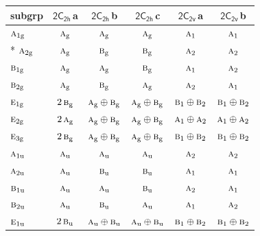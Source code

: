 \documentclass[10pt,a4paper]{article}
\numberwithin{equation}{section}
\newcommand{\grp}[1]{\mathsf{#1}}
\newcommand{\irr}[1]{\text{\normalfont\scshape #1}}
\newcommand{\ptag}[1]{\mathrm{#1}}
\newcommand{\clsletter}[1]{\,{\scriptsize\color{black!55}#1}}
\begin{document}
{\small\begin{longtable}{@{}lccccc@{}}\toprule
subgrp & \href{2C2h.pdf}{$\grp{2C_{2h}}$}\clsletter{a} & \href{2C2h.pdf}{$\grp{2C_{2h}}$}\clsletter{b} & \href{2C2h.pdf}{$\grp{2C_{2h}}$}\clsletter{c} & \href{2C2v.pdf}{$\grp{2C_{2v}}$}\clsletter{a} & \href{2C2v.pdf}{$\grp{2C_{2v}}$}\clsletter{b}\\\midrule\endhead
\bottomrule\endfoot\endlastfoot
$\irr{a}_{1\ptag{g}}$ & $\irr{a}_{\ptag{g}}$ & $\irr{a}_{\ptag{g}}$ & $\irr{a}_{\ptag{g}}$ & $\irr{a}_{1}$ & $\irr{a}_{1}$\\*
$\irr{a}_{2\ptag{g}}$ & $\irr{a}_{\ptag{g}}$ & $\irr{b}_{\ptag{g}}$ & $\irr{b}_{\ptag{g}}$ & $\irr{a}_{2}$ & $\irr{a}_{2}$\\
$\irr{b}_{1\ptag{g}}$ & $\irr{a}_{\ptag{g}}$ & $\irr{a}_{\ptag{g}}$ & $\irr{b}_{\ptag{g}}$ & $\irr{a}_{1}$ & $\irr{a}_{2}$\\
$\irr{b}_{2\ptag{g}}$ & $\irr{a}_{\ptag{g}}$ & $\irr{b}_{\ptag{g}}$ & $\irr{a}_{\ptag{g}}$ & $\irr{a}_{2}$ & $\irr{a}_{1}$\\
$\irr{e}_{1\ptag{g}}$ & $2\,\irr{b}_{\ptag{g}}$ & $\irr{a}_{\ptag{g}}\oplus \irr{b}_{\ptag{g}}$ & $\irr{a}_{\ptag{g}}\oplus \irr{b}_{\ptag{g}}$ & $\irr{b}_{1}\oplus \irr{b}_{2}$ & $\irr{b}_{1}\oplus \irr{b}_{2}$\\
$\irr{e}_{2\ptag{g}}$ & $2\,\irr{a}_{\ptag{g}}$ & $\irr{a}_{\ptag{g}}\oplus \irr{b}_{\ptag{g}}$ & $\irr{a}_{\ptag{g}}\oplus \irr{b}_{\ptag{g}}$ & $\irr{a}_{1}\oplus \irr{a}_{2}$ & $\irr{a}_{1}\oplus \irr{a}_{2}$\\
$\irr{e}_{3\ptag{g}}$ & $2\,\irr{b}_{\ptag{g}}$ & $\irr{a}_{\ptag{g}}\oplus \irr{b}_{\ptag{g}}$ & $\irr{a}_{\ptag{g}}\oplus \irr{b}_{\ptag{g}}$ & $\irr{b}_{1}\oplus \irr{b}_{2}$ & $\irr{b}_{1}\oplus \irr{b}_{2}$\\
$\irr{a}_{1\ptag{u}}$ & $\irr{a}_{\ptag{u}}$ & $\irr{a}_{\ptag{u}}$ & $\irr{a}_{\ptag{u}}$ & $\irr{a}_{2}$ & $\irr{a}_{2}$\\
$\irr{a}_{2\ptag{u}}$ & $\irr{a}_{\ptag{u}}$ & $\irr{b}_{\ptag{u}}$ & $\irr{b}_{\ptag{u}}$ & $\irr{a}_{1}$ & $\irr{a}_{1}$\\
$\irr{b}_{1\ptag{u}}$ & $\irr{a}_{\ptag{u}}$ & $\irr{a}_{\ptag{u}}$ & $\irr{b}_{\ptag{u}}$ & $\irr{a}_{2}$ & $\irr{a}_{1}$\\
$\irr{b}_{2\ptag{u}}$ & $\irr{a}_{\ptag{u}}$ & $\irr{b}_{\ptag{u}}$ & $\irr{a}_{\ptag{u}}$ & $\irr{a}_{1}$ & $\irr{a}_{2}$\\
$\irr{e}_{1\ptag{u}}$ & $2\,\irr{b}_{\ptag{u}}$ & $\irr{a}_{\ptag{u}}\oplus \irr{b}_{\ptag{u}}$ & $\irr{a}_{\ptag{u}}\oplus \irr{b}_{\ptag{u}}$ & $\irr{b}_{1}\oplus \irr{b}_{2}$ & $\irr{b}_{1}\oplus \irr{b}_{2}$\\

\end{longtable}}
\end{document}
